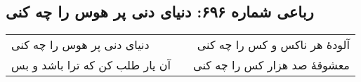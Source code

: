 \begin{center}
\section*{رباعی شماره ۶۹۶: دنیای دنی پر هوس را چه کنی}
\label{sec:sh696}
\begin{longtable}{l p{0.5cm} r}
دنیای دنی پر هوس را چه کنی
&&
آلودهٔ هر ناکس و کس را چه کنی
\\
آن یار طلب کن که ترا باشد و بس
&&
معشوقهٔ صد هزار کس را چه کنی
\\
\end{longtable}
\end{center}
